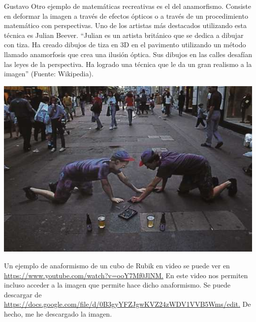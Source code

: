 \begin{opin}{\guscolor}{Gustavo}
Otro ejemplo de matemáticas recreativas es el del anamorfismo. Consiste en deformar la imagen a través de efectos ópticos o a través de un procedimiento matemático con perspectivas. Uno de los artistas más destacados utilizando esta técnica es Julian Beever. “Julian es un artista británico que se dedica a dibujar con tiza. Ha creado dibujos de tiza en 3D en el pavimento utilizando un método llamado anamorfosis que crea una ilusión óptica. Sus dibujos en las calles desafían las leyes de la perspectiva. Ha logrado una técnica que le da un gran realismo a la imagen” (Fuente: Wikipedia).

\begin{minipage}[h]{1\linewidth}
	\centering
	\includegraphics[width=0.7\linewidth]{img/anamorf2.jpg}
	
\end{minipage}
 
Un ejemplo de anaformismo de un cubo de Rubik en video se puede ver en  \url{https://www.youtube.com/watch?v=ooY7Mf0JlNM.} En este video nos permiten incluso acceder a la imagen que permite hace dicho anaformismo. Se puede descargar de \url{https://docs.google.com/file/d/0B3gyYFZJgwKVZ24zWDV1VVB5Wms/edit.} De hecho, me he descargado la imagen.


\end{opin}
